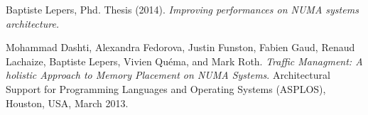 \begin{thebibliography}{99}

   Baptiste Lepers, Phd. Thesis (2014).
    \newblock \textit{Improving performances on NUMA systems architecture.}
  
   Mohammad Dashti, Alexandra Fedorova, Justin Funston,
    Fabien Gaud, Renaud Lachaize, Baptiste Lepers, Vivien Quéma, and Mark
    Roth.
    \newblock \textit{Traffic Managment: A holistic Approach to Memory
      Placement on NUMA Systems}.
    \newblock Architectural Support for Programming Languages and Operating
    Systems (ASPLOS), Houston, USA, March 2013.

\end{thebibliography}
